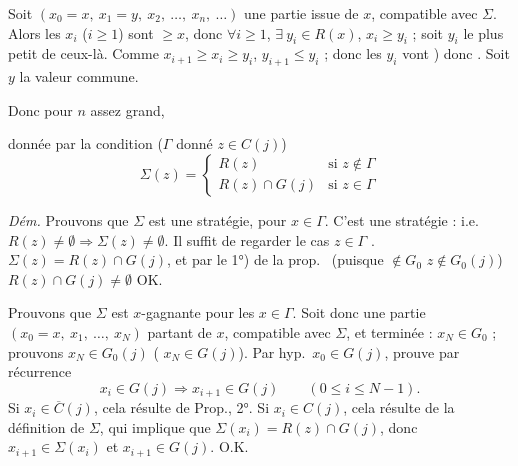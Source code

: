 \documentclass[11pt,a4paper]{article}
\begin{document}
Soit $(x_0=x,\ x_1=y,\ x_2,\ \ldots,\ x_n,\ \ldots)$ une partie issue de $x$, compatible avec $\Sigma$. Alors les $x_i$ ($i\geqslant 1$) sont $\geqslant x$,  donc $\forall i\geqslant 1$, $\exists\ y_i\in R(x)$,  \ill{} $x_i\geqslant y_i$ ; soit $y_i$ le plus petit de ceux-là. Comme $x_{i+1}\geqslant x_i\geqslant y_i$, \ill{} $y_{i+1}\leqslant y_i$ ; donc les $y_i$ vont ) donc . Soit $y$ la valeur commune.

Donc pour $n$ assez grand, \ill{}

donnée par la condition ($\Gamma$ donné  $z\in C(j)$)
\[
  \Sigma(z)=\begin{cases}
    R(z) & \text{si } z\notin\Gamma\\
    R(z)\cap G(j) & \text{si } z\in\Gamma
  \end{cases}
\]

\emph{Dém.} Prouvons que $\Sigma$ est une stratégie,  \ill{} pour  $x\in\Gamma$. C'est une stratégie : i.e.\ $R(z)\neq\emptyset\Longrightarrow\Sigma(z)\neq\emptyset$. Il suffit de regarder le cas  $z\in\Gamma$ .  $\Sigma(z)=R(z)\cap G(j)$, et par le 1°) de la prop.\ \ill{} (puisque  $\notin G_0$  $z\notin G_0(j)$) $R(z)\cap G(j)\neq\emptyset$ OK.

Prouvons que $\Sigma$ est $x$-gagnante pour les $x\in\Gamma$. Soit donc une partie $(x_0=x,\ x_1,\ \ldots,\ x_N)$  partant de $x$, compatible avec $\Sigma$, et terminée : $x_N\in G_0$ ; prouvons $x_N\in G_0(j)$ ( $x_N\in G(j)$). Par hyp.\ $x_0\in G(j)$,  prouve par récurrence
\[
  x_i\in G(j)\Longrightarrow x_{i+1}\in G(j) \qquad (0\leqslant i\leqslant N-1).
\]
Si $x_i\in\overline{C}(j)$, cela résulte de Prop., 2°. Si $x_i\in C(j)$, cela résulte de la définition de $\Sigma$, qui implique que $\Sigma(x_i)=R(z)\cap G(j)$,
donc $x_{i+1}\in\Sigma(x_i)$ et $x_{i+1}\in G(j)$. O.K.
\end{document}
